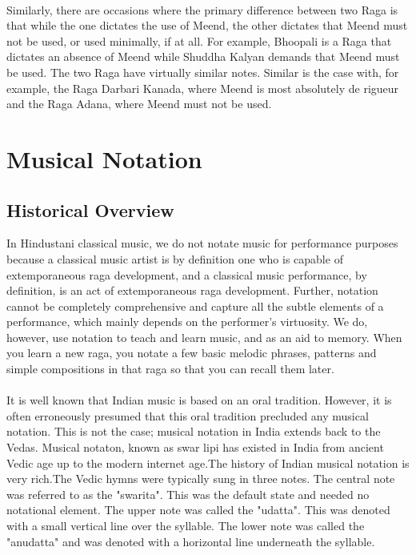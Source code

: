 \documentclass[12pt,a4paper]{article}
\begin{document}
\paragraph{}
Similarly, there are occasions where the primary difference between two Raga is that while the one dictates the use of Meend, the other dictates that Meend must not be used, or used minimally, if at all. For example, Bhoopali is a Raga that dictates an absence of Meend while Shuddha Kalyan demands that Meend must be used. The two Raga have virtually similar notes. Similar is the case with, for example, the Raga Darbari Kanada, where Meend is most absolutely de rigueur and the Raga Adana, where Meend must not be used. 

\newpage

\section{Musical Notation}
\subsection{Historical Overview }
In Hindustani classical music, we do not notate music for performance purposes because a classical music artist is by definition one who is capable of extemporaneous raga development, and a classical music performance, by definition, is an act of extemporaneous raga development. Further, notation cannot be completely comprehensive and capture all the subtle elements of a performance, which mainly depends on the performer's virtuosity. We do, however, use notation to teach and learn music, and as an aid to memory. When you learn a new raga, you notate a few basic melodic phrases, patterns and simple compositions in that raga so that you can recall them later.
\paragraph{}
It is well known that Indian music is based on an oral tradition.  However, it is often erroneously presumed that this oral tradition precluded any musical notation. This is not the case; musical notation in India extends back to the Vedas.  Musical notaton, known as swar lipi has existed in India from ancient Vedic age up to the modern internet age.The history of Indian musical notation is very rich.The Vedic hymns were typically sung in three notes.  The central note was referred to as the "swarita". This was the default state and needed no notational element.  The upper note was called the "udatta".  This was denoted with a small vertical line over the syllable.  The lower note was called the "anudatta" and was denoted with a horizontal line underneath the syllable.
\end{document}
